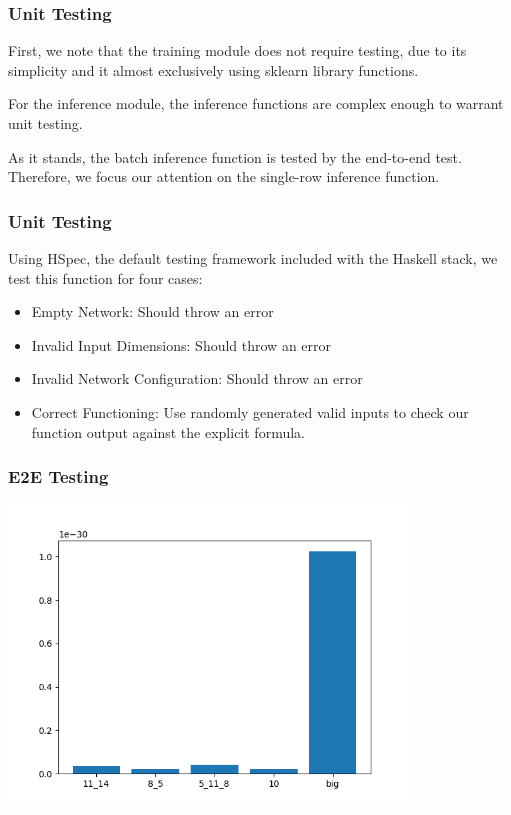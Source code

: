 \documentclass{beamer}
\begin{document}
\begin{frame}
  \frametitle{Unit Testing}

  First, we note that the training module does not require testing, due to its simplicity and it almost exclusively using sklearn library functions.\medskip
  
  For the inference module, the inference functions are complex enough to warrant unit testing.
  
  As it stands, the batch inference function is tested by the end-to-end test. Therefore, we focus our attention on the single-row inference function.
\end{frame}

\begin{frame}
  \frametitle{Unit Testing}

  Using HSpec, the default testing framework included with the Haskell stack, we test this function for four cases:
  \begin{itemize}
    \item Empty Network: Should throw an error
    \item Invalid Input Dimensions: Should throw an error
    \item Invalid Network Configuration: Should throw an error 
    \item Correct Functioning: Use randomly generated valid inputs to check our function output against the explicit formula.
  \end{itemize}
\end{frame}

\begin{frame}
  \frametitle{E2E Testing}
  \begin{center}
    \includegraphics[width=0.8\textwidth]{../images/mse.png}
  \end{center}
\end{frame}
\end{document}
